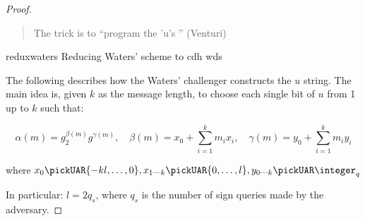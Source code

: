 \begin{proof}
    \begin{quote}
        The trick is to ``program the 'u's '' (Venturi)
    \end{quote}



    \begin{cryptoredux}
        {reduxwaters}
        {Reducing Waters' scheme to \cdh}
        {cdh}
        {wds}

        \cseqdelay


        \cseqdelay

        
        \cseqdelay
        \cseqdelay

        
    \end{cryptoredux}


    The following describes how the Waters' challenger constructs the $u$ string. The main idea is, given $k$ as the message length, to choose each single bit of $u$ from 1 up to $k$ such that:

    \begin{equation*}
        \alpha(m) = g_2^{\beta(m)}g^{\gamma(m)},\quad \beta(m) = x_0 + \sum_{i=1}^{k}m_ix_i,\quad \gamma(m) = y_0 + \sum_{i=1}^{k}m_iy_i
    \end{equation*}

    where $x_0 \pickUAR \{-kl, \dots, 0\}, x_{1\upto k} \pickUAR \{0, \dots, l\}, y_{0\upto k} \pickUAR \integer_q$

    In particular: $l = 2q_s$, where $q_s$ is the number of sign queries made by the adversary.


\end{proof}
